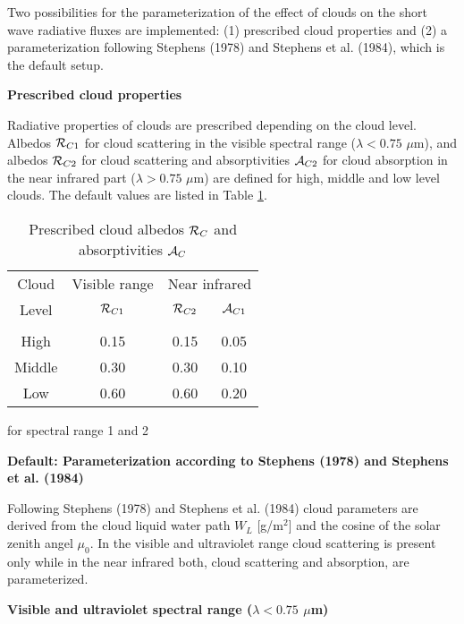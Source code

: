 Two possibilities for the parameterization of the effect
of clouds on the short wave radiative fluxes are
implemented: (1) prescribed cloud properties and (2)  a
parameterization following Stephens (1978) and
Stephens et al. (1984), which is the default setup.

{\bf Prescribed cloud properties}

Radiative properties of clouds are prescribed
depending on
the cloud level. Albedos ${\cal R}_{C1}$ for cloud
scattering in 
the visible spectral range ($\lambda <  0.75$ $\mu$m),
and
albedos ${\cal R}_{C2}$ for cloud scattering and
absorptivities
${\cal A}_{C2}$ for cloud absorption in the near infrared
part
($\lambda > 0.75$ $\mu$m) are defined for high,
middle
and low level clouds. The default values are listed in Table \ref{tabcl1}. 

{\protect
\begin{table}[h]
\begin{center}
\begin{tabular}{|c|c|c|c|}\hline
 Cloud        & Visible range
&\multicolumn{2}{c|}{Near
infrared} \\
 Level         &   ${\cal R}_{C1}$  &        ${\cal R}_{C2}$ &
${\cal A}_{C1}$         \\
\hline 
&&& \\
 High          &      0.15    &    0.15  &  0.05 \\
 Middle       &     0.30    &    0.30  &  0.10 \\
 Low           &     0.60    &    0.60  &  0.20 \\

\hline
\end{tabular}
\end{center}
\caption{\label{tabcl1} Prescribed cloud albedos
${\cal R}_{C}$ 
and absorptivities ${\cal A}_{C}$} for spectral range 1 and 2 
\end{table}
}

{\bf Default: Parameterization according to Stephens
(1978) and Stephens et al. (1984)}

Following Stephens (1978) and Stephens et al. (1984)
cloud parameters are derived from the cloud liquid
water path $W_L$ [g/m$^2$] and the cosine of the solar zenith
angel $\mu_0$. In the visible and ultraviolet range 
cloud scattering is present only while in the near
infrared both, cloud scattering and absorption,  are
parameterized.


{\bf Visible and ultraviolet spectral range ($\lambda <
0.75$ 
$\mu$m)} 

